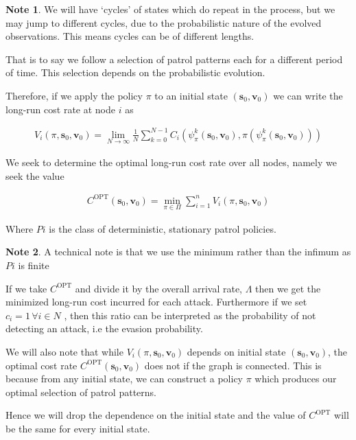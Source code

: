 \documentclass[a4paper,10pt]{article}
\theoremstyle{definition}
\theoremstyle{definition}
\theoremstyle{remark}
\theoremstyle{definition}
\newtheorem*{note}{Note}
\begin{document}
\begin{note}
We will have `cycles' of states which do repeat in the process, but we may jump to different cycles, due to the probabilistic nature of the evolved observations. This means cycles can be of different lengths.

That is to say we follow a selection of patrol patterns each for a different period of time. This selection depends on the probabilistic evolution. 

\end{note}

Therefore, if we apply the policy $\pi$ to an initial state $(\bm{s}_{0},\bm{v}_{0})$ we can write the long-run cost rate at node $i$ as

\begin{align*}
V_{i}(\pi,\bm{s}_{0},\bm{v}_{0})=\lim\limits_{N \rightarrow \infty} \frac{1}{N} \sum\limits_{k=0}^{N-1} C_{i}(\psi_{\pi}^{k}(\bm{s}_{0},\bm{v}_{0}),\pi(\psi_{\pi}^{k}(\bm{s}_{0},\bm{v}_{0})))
\end{align*}

We seek to determine the optimal long-run cost rate over all nodes, namely we seek the value

\begin{align}
C^{\text{OPT}}(\bm{s}_{0},\bm{v}_{0})= \min_{\pi \in \Pi} \sum\limits_{i=1}^{n} V_{i}(\pi,\bm{s}_{0},\bm{v}_{0})
\end{align}

Where $Pi$ is the class of deterministic, stationary patrol policies.

\begin{note}
A technical note is that we use the minimum rather than the infimum as $Pi$ is finite
\end{note}

If we take $C^{\text{OPT}}$ and divide it by the overall arrival rate, $\Lambda$ then we get the minimized long-run cost incurred for each attack. Furthermore if we set $c_{i}=1 \, \forall i \in N$ , then this ratio can be interpreted as the probability of not detecting an attack, i.e the evasion probability.

We will also note that while $V_{i}(\pi,\bm{s}_{0},\bm{v}_{0})$ depends on initial state $(\bm{s}_{0},\bm{v}_{0})$, the optimal cost rate $C^{\text{OPT}}(\bm{s}_{0},\bm{v}_{0})$ does not if the graph is connected. This is because from any initial state, we can construct a policy $\pi$ which produces our optimal selection of patrol patterns.

Hence we will drop the dependence on the initial state and the value of $C^{\text{OPT}}$ will be the same for every initial state. 
\end{document}
